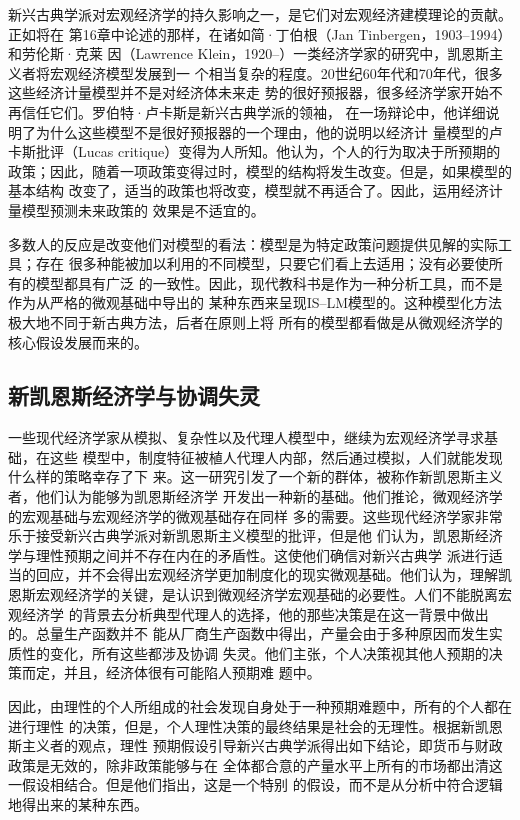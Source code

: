 新兴古典学派对宏观经济学的持久影响之一，是它们对宏观经济建模理论的贡献。正如将在
第16章中论述的那样，在诸如简·丁伯根（Jan Tinbergen，1903--1994）和劳伦斯·克莱
因（Lawrence Klein，1920--）一类经济学家的研究中，凯恩斯主义者将宏观经济模型发展到一
个相当复杂的程度。20世纪60年代和70年代，很多这些经济计量模型并不是对经济体未来走
势的很好预报器，很多经济学家开始不再信任它们。罗伯特·卢卡斯是新兴古典学派的领袖，
在一场辩论中，他详细说明了为什么这些模型不是很好预报器的一个理由，他的说明以经济计
量模型的卢卡斯批评（Lucas critique）变得为人所知。他认为，个人的行为取决于所预期的
政策；因此，随着一项政策变得过时，模型的结构将发生改变。但是，如果模型的基本结构
改变了，适当的政策也将改变，模型就不再适合了。因此，运用经济计量模型预测未来政策的
效果是不适宜的。

多数人的反应是改变他们对模型的看法：模型是为特定政策问题提供见解的实际工具；存在
很多种能被加以利用的不同模型，只要它们看上去适用；没有必要使所有的模型都具有广泛
的一致性。因此，现代教科书是作为一种分析工具，而不是作为从严格的微观基础中导出的
某种东西来呈现IS--LM模型的。这种模型化方法极大地不同于新古典方法，后者在原则上将
所有的模型都看做是从微观经济学的核心假设发展而来的。

\subsection{新凯恩斯经济学与协调失灵}

一些现代经济学家从模拟、复杂性以及代理人模型中，继续为宏观经济学寻求基础，在这些
模型中，制度特征被植人代理人内部，然后通过模拟，人们就能发现什么样的策略幸存了下
来。这一研究引发了一个新的群体，被称作新凯恩斯主义者，他们认为能够为凯恩斯经济学
开发出一种新的基础。他们推论，微观经济学的宏观基础与宏观经济学的微观基础存在同样
多的需要。这些现代经济学家非常乐于接受新兴古典学派对新凯恩斯主义模型的批评，但是他
们认为，凯恩斯经济学与理性预期之间并不存在内在的矛盾性。这使他们确信对新兴古典学
派进行适当的回应，并不会得出宏观经济学更加制度化的现实微观基础。他们认为，理解凯
恩斯宏观经济学的关键，是认识到微观经济学宏观基础的必要性。人们不能脱离宏观经济学
的背景去分析典型代理人的选择，他的那些决策是在这一背景中做出的。总量生产函数并不
能从厂商生产函数中得出，产量会由于多种原因而发生实质性的变化，所有这些都涉及协调
失灵。他们主张，个人决策视其他人预期的决策而定，并且，经济体很有可能陷人预期难
题中。

因此，由理性的个人所组成的社会发现自身处于一种预期难题中，所有的个人都在进行理性
的决策，但是，个人理性决策的最终结果是社会的无理性。根据新凯恩斯主义者的观点，理性
预期假设引导新兴古典学派得出如下结论，即货币与财政政策是无效的，除非政策能够与在
全体都合意的产量水平上所有的市场都出清这一假设相结合。但是他们指出，这是一个特别
的假设，而不是从分析中符合逻辑地得出来的某种东西。

